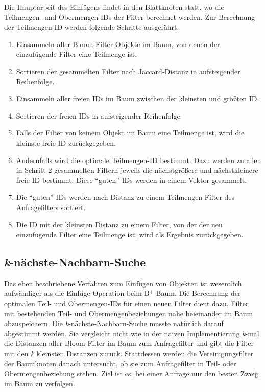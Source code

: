 Die Hauptarbeit des Einfügens findet in den Blattknoten statt, wo die Teilmengen- und Obermengen-IDs der Filter berechnet werden. Zur Berechnung der Teil\-mengen-ID werden folgende Schritte ausgeführt: 
\begin{enumerate}
\setlength{\itemsep}{20pt}
	\item Einsammeln aller Bloom-Filter-Objekte im Baum, von denen der einzufügende Filter eine Teilmenge ist.
	\item Sortieren der gesammelten Filter nach Jaccard-Distanz in aufsteigender Reihenfolge.
	\item Einsammeln aller freien IDs im Baum zwischen der kleinsten und größten ID. 
	\item Sortieren der freien IDs in aufsteigender Reihenfolge.
	\item Falls der Filter von keinem Objekt im Baum eine Teilmenge ist, wird die kleinste freie ID zurückgegeben. 
	\item Andernfalls wird die optimale Teilmengen-ID bestimmt. Dazu werden zu allen in Schritt 2 gesammelten Filtern jeweils die nächstgrößere und nächstkleinere freie ID bestimmt. Diese "`guten"' IDs werden in einem Vektor gesammelt. 
	\item Die "`guten"' IDs werden nach Distanz zu einem Teilmengen-Filter des Anfragefilters sortiert. 
	\item Die ID mit der kleinsten Distanz zu einem Filter, von der der neu einzufügende Filter eine Teilmenge ist, wird als Ergebnis zurückgegeben. 
\end{enumerate}
\subsection{\textit{k}-nächste-Nachbarn-Suche}\label{sec:knn}
Das eben beschriebene Verfahren zum Einfügen von Objekten ist wesentlich aufwändiger als die Einfüge-Operation beim B$^+$-Baum. Die Berechnung der optimalen Teil- und Obermengen-IDs für einen neuen Filter dient dazu, Filter mit bestehenden Teil- und Obermengenbeziehungen nahe beieinander im Baum abzuspeichern. Die \textit{k}-nächste-Nachbarn-Suche musste natürlich darauf abgestimmt werden. Sie vergleicht nicht wie in der naiven Implementierung \textit{k}-mal die Distanzen aller Bloom-Filter im Baum zum Anfragefilter und gibt die Filter mit den \textit{k} kleinsten Distanzen zurück. Stattdessen werden die Vereinigungsfilter der Baumknoten danach untersucht, ob sie zum Anfragefilter in Teil- oder Obermengenbeziehung stehen. Ziel ist es, bei einer Anfrage nur den besten Zweig im Baum zu verfolgen.

